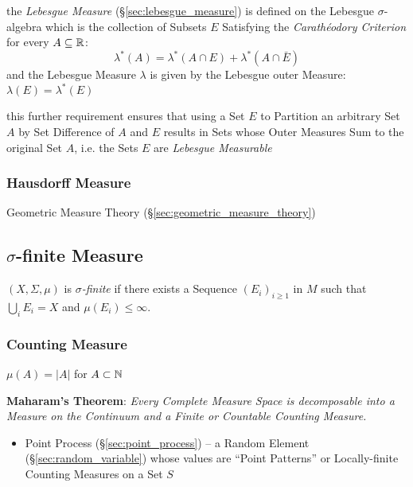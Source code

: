 the \emph{Lebesgue Measure} (\S\ref{sec:lebesgue_measure}) is defined on the
Lebesgue $\sigma$-algebra which is the collection of Subsets $E$ Satisfying the
\emph{Carath\'eodory Criterion} for every $A \subseteq \mathbb{R}$:
\[
  \lambda^*(A) = \lambda^*(A \cap E) + \lambda^*(A \cap \bar{E})
\]
and the Lebesgue Measure $\lambda$ is given by the Lebesgue outer Measure:
$\lambda(E) = \lambda^*(E)$

this further requirement ensures that using a Set $E$ to Partition an arbitrary
Set $A$ by Set Difference of $A$ and $E$ results in Sets whose Outer Measures
Sum to the original Set $A$, i.e. the Sets $E$ are \emph{Lebesgue Measurable}



\subsubsection{Hausdorff Measure}\label{sec:hausdorff_measure}

\fist Geometric Measure Theory (\S\ref{sec:geometric_measure_theory})



\subsection{$\sigma$-finite Measure}\label{sec:sigma_finite}

$(X,\Sigma,\mu)$ is \emph{$\sigma$-finite} if there exists a Sequence
$(E_i)_{i \geq 1}$ in $M$ such that $\bigcup_{i} E_i = X$ and
$\mu(E_i) \leq \infty$.



\subsubsection{Counting Measure}\label{sec:counting_measure}

$\mu(A) = |A|$ for $A \subset \mathbb{N}$

\textbf{Maharam's Theorem}: \emph{
  Every Complete Measure Space is decomposable into a Measure on the Continuum
  and a Finite or Countable Counting Measure.
}

\begin{itemize}
  \item Point Process (\S\ref{sec:point_process}) -- a Random Element
    (\S\ref{sec:random_variable}) whose values are ``Point Patterns'' or
    Locally-finite Counting Measures on a Set $S$
\end{itemize}



